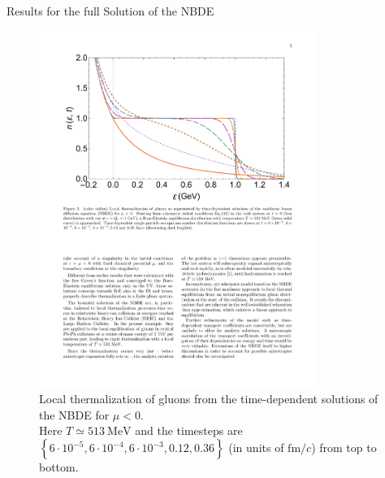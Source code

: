 \begin{frame}{Results for the full Solution of the NBDE}
\begin{figure}[H]
\centering
\includegraphics[width=0.8\textwidth]{figures/nbde_full_result}
\caption{Local thermalization of gluons from the time-dependent solutions of the NBDE for $\mu<0$. \cite{Wolschin2020_1} \\ 
Here $T \simeq 513\ \mathrm{MeV}$ and the timesteps are $\left\{6\cdot10^{-5}, 6\cdot10^{-4}, 6\cdot10^{-3},0.12,0.36\right\}$ (in units of $\mathrm{fm}/c$) from top to bottom.}
\end{figure}
\end{frame}